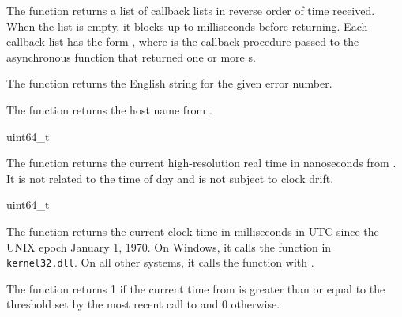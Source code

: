 The  function returns a list of callback
lists in reverse order of time received. When the list is empty, it
blocks up to  milliseconds before returning. Each
callback list has the form ,
where  is the callback procedure passed to the
asynchronous function that returned one or more s.

\begin{function}
\end{function}

The  function returns the English string
for the given error number.

\begin{function}
\end{function}

The  function returns the host name from
.

\begin{function}
  uint64\_t 
\end{function}

The  function returns the current
high-resolution real time in nanoseconds from . It is
not related to the time of day and is not subject to clock drift.

\begin{function}
  uint64\_t 
\end{function}

The  function returns the current clock time in
milliseconds in UTC since the UNIX epoch January 1, 1970. On Windows,
it calls the  function in
\texttt{kernel32.dll}. On all other systems, it calls the
 function with .

\begin{function}
\end{function}

The  function returns 1 if the current time
from  is greater than or equal to the threshold set
by the most recent call to  and 0 otherwise.

